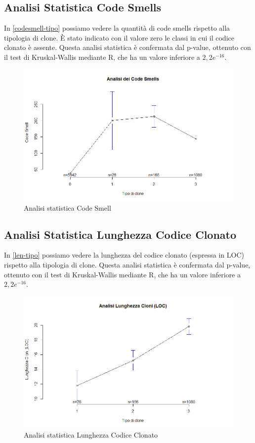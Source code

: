 \subsection{Analisi Statistica Code Smells}
In \autoref{codesmell-tipo} possiamo vedere la quantità di code smells rispetto alla tipologia di clone. È stato indicato con il valore zero le classi in cui il codice clonato è assente. Questa analisi statistica è confermata dal p-value, ottenuto con il test di Kruskal-Wallis mediante R, che ha un valore inferiore a $2,2 e^{-16}$.
\begin{figure}[htbp]
	\centering
	\includegraphics[scale=0.5]{analisi_R/AnalisiJabref/2-gplot-codesmell-type.png}
\caption{Analisi statistica Code Smell}
\label{codesmell-tipo}
\end{figure}


\subsection{Analisi Statistica Lunghezza Codice Clonato}
In \autoref{len-tipo} possiamo vedere la lunghezza del codice clonato (espressa in LOC) rispetto alla tipologia di clone. Questa analisi statistica è confermata dal p-value, ottenuto con il test di Kruskal-Wallis mediante R, che ha un valore inferiore a $2,2 e^{-16}$. \newpage
\begin{figure}[htbp]
	\centering
	\includegraphics[scale=0.5]{analisi_R/AnalisiJabref/3-gplot-len-type.png}
\caption{Analisi statistica Lunghezza Codice Clonato }
\label{len-tipo}
\end{figure}
